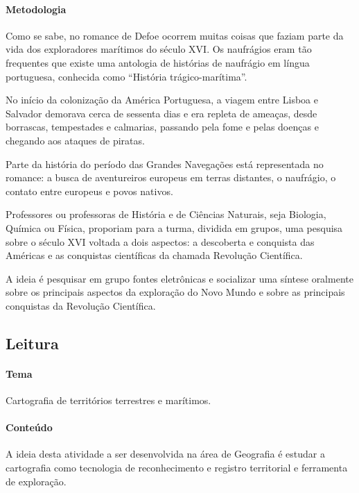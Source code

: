 \documentclass[12pt]{extarticle}
\begin{document}
\paragraph{Metodologia}
Como se sabe, no romance de Defoe ocorrem muitas coisas que faziam parte
da vida dos exploradores marítimos do século XVI. Os naufrágios eram tão
frequentes que existe uma antologia de histórias de naufrágio em língua
portuguesa, conhecida como ``História trágico-marítima''.

No início da colonização da América Portuguesa, a viagem entre Lisboa e
Salvador demorava cerca de sessenta dias e era repleta de ameaças, desde
borrascas, tempestades e calmarias, passando pela fome e pelas doenças e
chegando aos ataques de piratas.

Parte da história do período das Grandes Navegações está representada no
romance: a busca de aventureiros europeus em terras distantes, o
naufrágio, o contato entre europeus e povos nativos.

Professores ou professoras de História e de Ciências Naturais, seja
Biologia, Química ou Física, proporiam para a turma, dividida em grupos,
uma pesquisa sobre o século XVI voltada a dois aspectos: a descoberta e
conquista das Américas e as conquistas científicas da chamada Revolução
Científica.

A ideia é pesquisar em grupo fontes eletrônicas e socializar uma síntese
oralmente sobre os principais aspectos da exploração do Novo Mundo e
sobre as principais conquistas da Revolução Científica.



\subsection{Leitura}

\paragraph{Tema} Cartografia de territórios terrestres e marítimos.


\paragraph{Conteúdo}
A ideia desta atividade a ser desenvolvida na área de Geografia é
estudar a cartografia como tecnologia de reconhecimento e registro
territorial e ferramenta de exploração.
\end{document}
